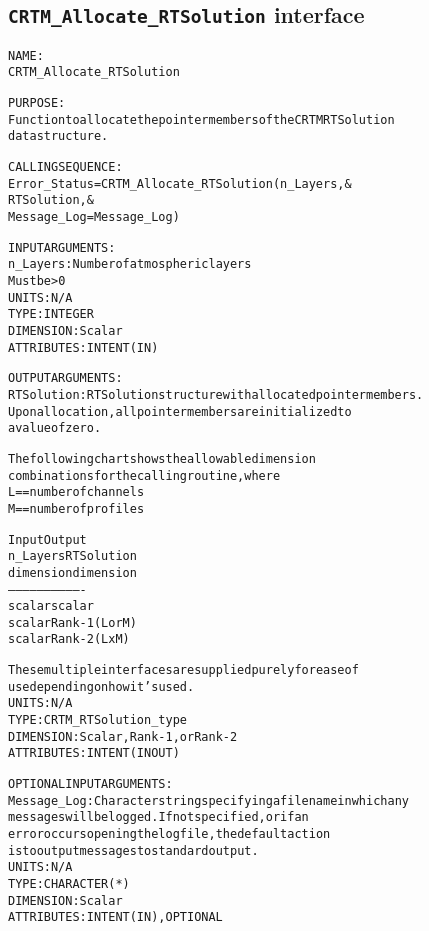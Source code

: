 \subsection{\texttt{CRTM\_Allocate\_RTSolution} interface}
  \label{sec:CRTM_Allocate_RTSolution_interface}
  \begin{alltt}
 
  NAME:
        CRTM_Allocate_RTSolution
  
  PURPOSE:
        Function to allocate the pointer members of the CRTM RTSolution
        data structure.
 
  CALLING SEQUENCE:
        Error_Status = CRTM_Allocate_RTSolution( n_Layers               , &
                                                 RTSolution             , &
                                                 Message_Log=Message_Log  )
 
  INPUT ARGUMENTS:
        n_Layers:     Number of atmospheric layers 
                      Must be > 0
                      UNITS:      N/A
                      TYPE:       INTEGER
                      DIMENSION:  Scalar
                      ATTRIBUTES: INTENT(IN)
 
  OUTPUT ARGUMENTS:
        RTSolution:   RTSolution structure with allocated pointer members.
                      Upon allocation, all pointer members are initialized to
                      a value of zero.
 
                      The following chart shows the allowable dimension
                      combinations for the calling routine, where
                        L == number of channels
                        M == number of profiles
 
                         Input           Output
                        n_Layers       RTSolution
                        dimension      dimension
                      -------------------------------
                         scalar         scalar
                         scalar      Rank-1 (L or M)
                         scalar      Rank-2 (L x M)
 
                      These multiple interfaces are supplied purely for ease of
                      use depending on how it's used.
                      UNITS:      N/A
                      TYPE:       CRTM_RTSolution_type
                      DIMENSION:  Scalar, Rank-1, or Rank-2
                      ATTRIBUTES: INTENT(IN OUT)
 
  OPTIONAL INPUT ARGUMENTS:
        Message_Log:  Character string specifying a filename in which any
                      messages will be logged. If not specified, or if an
                      error occurs opening the log file, the default action
                      is to output messages to standard output.
                      UNITS:      N/A
                      TYPE:       CHARACTER(*)
                      DIMENSION:  Scalar
                      ATTRIBUTES: INTENT(IN), OPTIONAL
 

\end{alltt}
